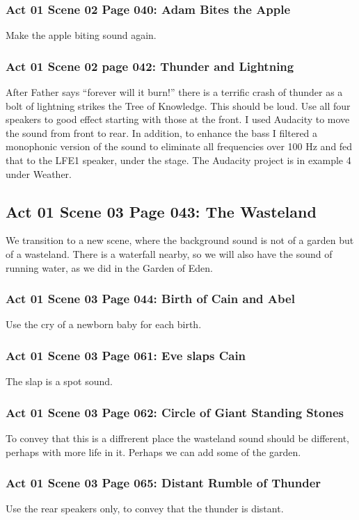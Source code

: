 \documentclass[letterpaper,twoside]{article}
\begin{document}
\subsubsection{Act 01 Scene 02 Page 040: Adam Bites the Apple}
Make the apple biting sound again.
\subsubsection{Act 01 Scene 02 page 042: Thunder and Lightning}
After Father says ``forever will it burn!'' there is a terrific
crash of thunder as a bolt of lightning strikes the Tree of Knowledge.
This should be loud.  Use all four speakers to good effect
starting with those at the front.  I used Audacity to move the sound
from front to rear.  In addition, to enhance the bass
I filtered a monophonic version of
the sound to eliminate all frequencies over 100 Hz and fed that
to the LFE1 speaker, under the stage.  The Audacity project is in
example 4 under Weather.
\subsection{Act 01 Scene 03 Page 043: The Wasteland}
We transition to a new scene, where the background sound
is not of a garden but of a wasteland.  There is a waterfall
nearby, so we will also have the sound of running water, as
we did in the Garden of Eden.
\subsubsection{Act 01 Scene 03 Page 044: Birth of Cain and Abel}
Use the cry of a newborn baby for each birth.
\subsubsection{Act 01 Scene 03 Page 061: Eve slaps Cain}
The slap is a spot sound.
\subsubsection{Act 01 Scene 03 Page 062: Circle of Giant Standing Stones}
To convey that this is a diffrerent place the wasteland sound
should be different, perhaps with more life in it.
Perhaps we can add some of the garden.
\subsubsection{Act 01 Scene 03 Page 065: Distant Rumble of Thunder}
Use the rear speakers only, to convey that the thunder is distant.
\end{document}

